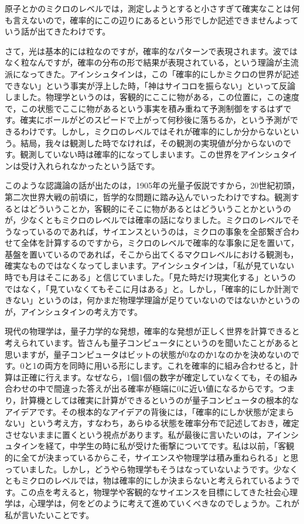\documentclass{ltjsbook}
\begin{document}
原子とかのミクロのレベルでは，測定しようとすると小さすぎて確実なことは何も言えないので，確率的にこの辺りにあるという形でしか記述できませんよっていう話が出てきたわけです。

さて，光は基本的には粒なのですが，確率的なパターンで表現されます。波ではなく粒なんですが，確率の分布の形で結果が表現されている，という理論が主流派になってきた。アインシュタインは，この「確率的にしかミクロの世界が記述できない」という事実が浮上した時，「神はサイコロを振らない」といって反論しました。物理学というのは，客観的にここに物がある，この位置に，この速度で，この状態でここに物があるという事実を積み重ねて予測制御をするはずです。確実にボールがどのスピードで上がって何秒後に落ちるか，という予測ができるわけです。しかし，ミクロのレベルではそれが確率的にしか分からないという。結局，我々は観測した時でなければ，その観測の実現値が分からないのです。観測していない時は確率的になってしまいます。この世界をアインシュタインは受け入れられなかったという話です。

このような認識論の話が出たのは，1905年の光量子仮説ですから，20世紀初頭，第二次世界大戦の前頃に，哲学的な問題に踏み込んでいったわけですね。観測するとはどういうことか，客観的にそこに物があるとはどういうことかというのが，少なくともミクロのレベルでは確率の話になりました。ミクロのレベルでそうなっているのであれば，サイエンスというのは，ミクロの事象を全部繋ぎ合わせて全体を計算するのですから，ミクロのレベルで確率的な事象に足を置いて，基盤を置いているのであれば，そこから出てくるマクロレベルにおける観測も，確実なものではなくなってしまいます。アインシュタインは，「私が見ていない時でも月はそこにある」と信じていました。「見た時だけ現実化する」というのではなく，「見ていなくてもそこに月はある」と。しかし，「確率的にしか計測できない」というのは，何かまだ物理学理論が足りていないのではないかというのが，アインシュタインの考え方です。

現代の物理学は，量子力学的な発想，確率的な発想が正しく世界を計算できると考えられています。皆さんも量子コンピュータにというのを聞いたことがあると思いますが，量子コンピュータはビットの状態が0なのか1なのかを決めないのです。0と1の両方を同時に用いる形にします。これを確率的に組み合わせると，計算は正確に行えます。なぜなら，1個1個の数字が確定していなくても，その組み合わせの中で間違った答えが出る確率が極端に0に近い値になるからです。つまり，計算機としては確実に計算ができるというのが量子コンピュータの根本的なアイデアです。その根本的なアイデアの背後には，「確率的にしか状態が定まらない」という考え方，すなわち，あらゆる状態を確率分布で記述しておき，確定させないままに置くという視点があります。私が最後に言いたいのは，アインシュタインを経て，中学生の時に私が受けた衝撃についてです。私は以前，「客観的に全てが決まっているからこそ，サイエンスや物理学は積み重ねられる」と思っていました。しかし，どうやら物理学もそうはなっていないようです。少なくともミクロのレベルでは，物は確率的にしか決まらないと考えられているようです。この点を考えると，物理学や客観的なサイエンスを目標にしてきた社会心理学は，心理学は，何をどのように考えて進めていくべきなのでしょうか。これが私が言いたいことです。
\end{document}
